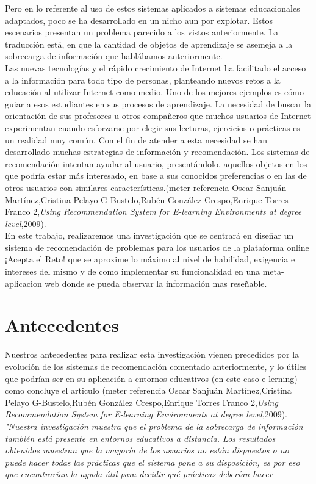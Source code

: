 Pero en lo referente al uso de estos sistemas aplicados a sistemas educacionales adaptados, poco se ha desarrollado en un nicho aun por explotar. Estos escenarios presentan un problema parecido a los vistos anteriormente. La traducción está, en que la cantidad de objetos de aprendizaje se asemeja a la sobrecarga de información que hablábamos anteriormente. \\

Las nuevas tecnologías y el rápido crecimiento de Internet ha facilitado el acceso a la información para todo tipo de personas, planteando nuevos retos a la educación al utilizar Internet como medio. Uno de los mejores ejemplos es cómo guiar a esos estudiantes en sus procesos de aprendizaje. La necesidad de buscar la orientación de sus profesores u otros compañeros que muchos usuarios de Internet experimentan cuando esforzarse por elegir sus lecturas, ejercicios o prácticas es un realidad muy común. Con el fin de atender a esta necesidad se han desarrollado muchas estrategias de información y recomendación. Los sistemas de recomendación intentan ayudar al usuario, presentándolo. aquellos objetos en los que podría estar más interesado, en base a sus conocidos preferencias o en las de otros usuarios con similares características.(meter referencia Oscar Sanjuán Martínez,Cristina Pelayo G-Bustelo,Rubén González Crespo,Enrique Torres Franco 2,\textit{Using Recommendation System for E-learning Environments at degree level},2009). \\


En este trabajo, realizaremos una investigación que se centrará en diseñar un sistema de recomendación de problemas para los usuarios de la plataforma online ¡Acepta el Reto! que se aproxime lo máximo al nivel de habilidad, exigencia e intereses del mismo y de como implementar su funcionalidad en una meta-aplicacion web donde se pueda observar la información mas reseñable.


\section{Antecedentes}

Nuestros antecedentes para realizar esta investigación vienen precedidos por la evolución de los sistemas de recomendación comentado anteriormente, y lo útiles que podrían ser en su aplicación a entornos educativos (en este caso e-lerning) como concluye el articulo (meter referencia Oscar Sanjuán Martínez,Cristina Pelayo G-Bustelo,Rubén González Crespo,Enrique Torres Franco 2,\textit{Using Recommendation System for E-learning Environments at degree level},2009). \textit{"Nuestra investigación muestra que el problema de la sobrecarga de información también está presente en entornos educativos a distancia. Los resultados obtenidos muestran que la mayoría de los usuarios no están dispuestos o no puede hacer todas las prácticas que el sistema pone a su disposición, es por eso que encontrarían la ayuda útil para decidir qué prácticas deberían hacer} \\

